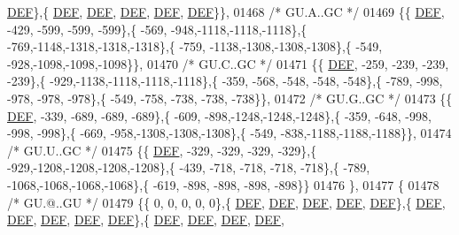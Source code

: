 \begin{DoxyCode}
      \mbox{\hyperlink{1_88_84__epars_8h_a397419fc12b37ed479c8abb9d444d843}{DEF}}\},\{  \mbox{\hyperlink{1_88_84__epars_8h_a397419fc12b37ed479c8abb9d444d843}{DEF}},  \mbox{\hyperlink{1_88_84__epars_8h_a397419fc12b37ed479c8abb9d444d843}{DEF}},  \mbox{\hyperlink{1_88_84__epars_8h_a397419fc12b37ed479c8abb9d444d843}{DEF}},  \mbox{\hyperlink{1_88_84__epars_8h_a397419fc12b37ed479c8abb9d444d843}{DEF}},  \mbox{\hyperlink{1_88_84__epars_8h_a397419fc12b37ed479c8abb9d444d843}{DEF}}\}\},
01468 \textcolor{comment}{/* GU.A..GC */}
01469 \{\{  \mbox{\hyperlink{1_88_84__epars_8h_a397419fc12b37ed479c8abb9d444d843}{DEF}}, -429, -599, -599, -599\},\{ -569, -948,-1118,-1118,-1118\},\{ -769,-1148,-1318,-1318,-1318\},\{ -759,
      -1138,-1308,-1308,-1308\},\{ -549, -928,-1098,-1098,-1098\}\},
01470 \textcolor{comment}{/* GU.C..GC */}
01471 \{\{  \mbox{\hyperlink{1_88_84__epars_8h_a397419fc12b37ed479c8abb9d444d843}{DEF}}, -259, -239, -239, -239\},\{ -929,-1138,-1118,-1118,-1118\},\{ -359, -568, -548, -548, -548\},\{ -789,
       -998, -978, -978, -978\},\{ -549, -758, -738, -738, -738\}\},
01472 \textcolor{comment}{/* GU.G..GC */}
01473 \{\{  \mbox{\hyperlink{1_88_84__epars_8h_a397419fc12b37ed479c8abb9d444d843}{DEF}}, -339, -689, -689, -689\},\{ -609, -898,-1248,-1248,-1248\},\{ -359, -648, -998, -998, -998\},\{ -669,
       -958,-1308,-1308,-1308\},\{ -549, -838,-1188,-1188,-1188\}\},
01474 \textcolor{comment}{/* GU.U..GC */}
01475 \{\{  \mbox{\hyperlink{1_88_84__epars_8h_a397419fc12b37ed479c8abb9d444d843}{DEF}}, -329, -329, -329, -329\},\{ -929,-1208,-1208,-1208,-1208\},\{ -439, -718, -718, -718, -718\},\{ -789,
      -1068,-1068,-1068,-1068\},\{ -619, -898, -898, -898, -898\}\}
01476 \},
01477 \{
01478 \textcolor{comment}{/* GU.@..GU */}
01479 \{\{    0,    0,    0,    0,    0\},\{  \mbox{\hyperlink{1_88_84__epars_8h_a397419fc12b37ed479c8abb9d444d843}{DEF}},  \mbox{\hyperlink{1_88_84__epars_8h_a397419fc12b37ed479c8abb9d444d843}{DEF}},  \mbox{\hyperlink{1_88_84__epars_8h_a397419fc12b37ed479c8abb9d444d843}{DEF}},  \mbox{\hyperlink{1_88_84__epars_8h_a397419fc12b37ed479c8abb9d444d843}{DEF}},  \mbox{\hyperlink{1_88_84__epars_8h_a397419fc12b37ed479c8abb9d444d843}{DEF}}\},\{  
      \mbox{\hyperlink{1_88_84__epars_8h_a397419fc12b37ed479c8abb9d444d843}{DEF}},  \mbox{\hyperlink{1_88_84__epars_8h_a397419fc12b37ed479c8abb9d444d843}{DEF}},  \mbox{\hyperlink{1_88_84__epars_8h_a397419fc12b37ed479c8abb9d444d843}{DEF}},  \mbox{\hyperlink{1_88_84__epars_8h_a397419fc12b37ed479c8abb9d444d843}{DEF}},  \mbox{\hyperlink{1_88_84__epars_8h_a397419fc12b37ed479c8abb9d444d843}{DEF}}\},\{  \mbox{\hyperlink{1_88_84__epars_8h_a397419fc12b37ed479c8abb9d444d843}{DEF}},  \mbox{\hyperlink{1_88_84__epars_8h_a397419fc12b37ed479c8abb9d444d843}{DEF}},  \mbox{\hyperlink{1_88_84__epars_8h_a397419fc12b37ed479c8abb9d444d843}{DEF}},  \mbox{\hyperlink{1_88_84__epars_8h_a397419fc12b37ed479c8abb9d444d843}{DEF}},  

\end{DoxyCode}
